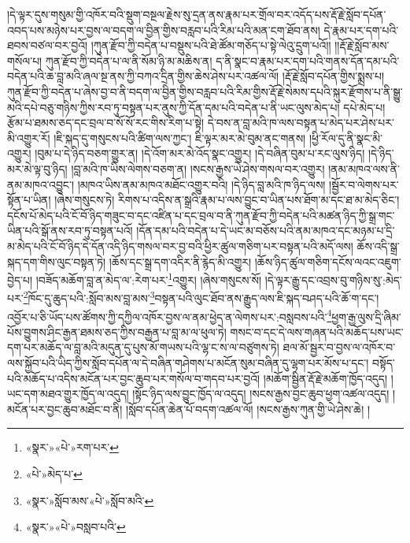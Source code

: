 །དེ་ལྟར་དུས་གསུམ་གྱི་འཁོར་བའི་སྡུག་བསྔལ་རྗེས་སུ་དྲན་ནས་རྣམ་པར་གྲོལ་བར་འདོད་པས་རྡོ་རྗེ་སློབ་དཔོན་འབད་པས་མཉེས་པར་བྱས་ལ་བདག་ལ་བྱིན་གྱིས་བརླབ་པའི་རིམ་པའི་མན་ངག་ཐོབ་ནས། དེ་རྣམ་པར་དག་པའི་ཐབས་བཙལ་བར་བྱའོ། །ཀུན་རྫོབ་ཀྱི་བདེན་པ་བསྡུས་པའི་ཐེ་ཚོམ་གཅོད་པ་སྟེ་ལེའུ་དྲུག་པའོ།། །།རྡོ་རྗེ་སློབ་མས་གསོལ་པ། ཀུན་རྫོབ་ཀྱི་བདེན་པ་ལ་ནི་སོམ་ཉི་མ་མཆིས་ན། ད་ནི་སྣང་བ་རྣམ་པར་དག་པའི་གནས་དོན་དམ་པའི་བདེན་པའི་ཆ་བླ་མའི་ཞལ་སྔ་ནས་ཀྱི་བཀའ་དྲིན་གྱིས་ཆེས་ཤེས་པར་འཚལ་ལོ། །རྡོ་རྗེ་སློབ་དཔོན་གྱིས་སྨྲས་པ། ཀུན་རྫོབ་ཀྱི་བདེན་པ་ཞེས་བྱ་བ་ནི་བདག་ལ་བྱིན་གྱིས་བརླབ་པའི་རིམ་གྱིས་རྡོ་རྗེ་སེམས་དཔའི་སྐུར་རྫོགས་པ་ནི་སྒྱུ་མའི་དཔེ་བཅུ་གཉིས་ཀྱིས་རབ་ཏུ་བསྟན་པར་ནུས་ཀྱི་དོན་དམ་པའི་བདེན་པ་ནི་ཡང་ལུས་མེད་པ། དཔེ་མེད་པ། རྩོམ་པ་ཐམས་ཅད་དང་བྲལ་བ་སོ་སོ་རང་གིས་རིག་པ་སྟེ། དེ་བས་ན་བླ་མའི་ཁ་ལས་བསྟན་པ་མེད་པར་ཤེས་པར་མི་འགྱུར་རོ། །ཇི་སྐད་དུ་གསུངས་པའི་ཚིག་ལས་ཀྱང་། ཇི་ལྟར་མར་མེ་བུམ་ནང་གནས། །ཕྱི་རོལ་དུ་ནི་སྣང་མི་འགྱུར། །བུམ་པ་དེ་ཉིད་བཅག་གྱུར་ན། །དེ་འོག་མར་མེ་འོད་སྣང་འགྱུར། །དེ་བཞིན་བུམ་པ་རང་ལུས་ཉིད། །དེ་ཉིད་མར་མེ་ལྟ་བུ་ཉིད། །བླ་མའི་ཁ་ཡིས་ལེགས་བཅག་ན། །སངས་རྒྱས་ཡེ་ཤེས་གསལ་བར་འགྱུར། །ནམ་མཁའ་ལས་ནི་ནམ་མཁའ་འབྱུང་། །མཁའ་ཡིས་ནམ་མཁའ་མཐོང་འགྱུར་བའི། །དེ་ཉིད་བླ་མའི་ཁ་ཉིད་ལས། །སྦྱོར་བ་ལེགས་པར་སྟོན་པ་ཡིན། །ཞེས་གསུངས་ཏེ། རིགས་པ་འདིས་ན་སྒྲའི་རྣམ་པ་ལས་བྱུང་བ་ཡིན་པས་ཐོག་མ་དང་ཐ་མ་མེད་ཅིང་། དངོས་པོ་མེད་པའི་ངོ་བོ་ཉིད་གཟུང་བ་དང་འཛིན་པ་དང་བྲལ་བ་ནི་ཀུན་རྫོབ་ཀྱི་བདེན་པའི་མཚན་ཉིད་ཀྱི་སྒྲ་གང་ཡིན་པའི་སྒོ་ནས་རབ་ཏུ་བསྟན་པའོ། །དོན་དམ་པའི་བདེན་པ་དེ་ཡང་མ་བཅོས་པའི་ནམ་མཁའ་དང་མཉམ་པ་དྲི་མ་མེད་པའི་ངོ་བོ་ཉིད་དེ་དོན་འདི་ཉིད་གསལ་བར་བྱ་བའི་ཕྱིར་ཚུལ་གཅིག་པར་བསྟན་པའི་མདོ་ལས། ཆོས་འདི་སྒྲ་སྐད་དག་གིས་ལུང་བསྟན་ཏེ། །ཆོས་དང་སྒྲ་དག་འདིར་ནི་རྙེད་མི་འགྱུར། །ཆོས་ཉིད་ཚུལ་གཅིག་དངོས་ལའང་འཇུག་བྱེད་པ། །བཟོད་མཆོག་བླ་ན་མེད་ལ་:རེག་པར་\footnote{«སྣར་»«པེ་»རག་པར་}འགྱུར། །ཞེས་གསུངས་སོ། །དེ་ལྟར་རྒྱུ་དང་འབྲས་བུ་གཉིས་སུ་:མེད་པར་\footnote{«པེ་»མེད་པ་}ཁོང་དུ་ཆུད་པའི་:སློབ་མས་བླ་མས་\footnote{«སྣར་»སློབ་མས་«པེ་»སློབ་མའི་}བསྟན་པའི་ལུང་ཐོབ་ནས་རྒྱུད་ལས་ཇི་སྐད་བཤད་པའི་ཆོ་ག་དང་། འབྱོར་པ་ཅི་ཡོད་པས་ཚོགས་ཀྱི་དཀྱིལ་འཁོར་བྱས་ལ་ནམ་ཕྱེད་ན་ལེགས་པར་:བསླབས་པའི་\footnote{«སྣར་»«པེ་»བསླབ་པའི་}ཕྱག་རྒྱ་ལུས་དྲི་ཞིམ་པོས་བྱུགས་ཤིང་རྒྱན་ཐམས་ཅད་ཀྱིས་བརྒྱན་པ་བླ་མ་ལ་ཕུལ་ཏེ། གསང་བ་དང་དེ་ལས་གཞན་པའི་མཆོད་པས་ཡང་དག་པར་མཆོད་ལ་བླ་མའི་མདུན་དུ་པུས་མོ་གཡས་པའི་ལྷ་ང་ས་ལ་བཙུགས་ཏེ། ཐལ་མོ་སྦྱར་བ་བྱས་ལ་འཁོར་བ་ལས་སྐྱོབ་པའི་ཡིད་ཀྱིས་སློབ་དཔོན་ལ་དེ་བཞིན་གཤེགས་པ་མངོན་སུམ་བཞིན་དུ་ལྷག་པར་མོས་པ་དང་། བསྟོད་པའི་མཆོད་པ་འདིས་མངོན་པར་བྱང་ཆུབ་པར་གསོལ་བ་གདབ་པར་བྱའོ། །མཆོག་སྦྱིན་རྡོ་རྗེ་མཆོག་ཁྱོད་འདུད། །ཡང་དག་མཐའ་གྱུར་ཁྱོད་ལ་འདུད། །སྟོང་ཉིད་ལས་བྱུང་ཁྱོད་ལ་འདུད། །སངས་རྒྱས་བྱང་ཆུབ་ཕྱག་འཚལ་འདུད། །མངོན་པར་བྱང་ཆུབ་མཐོང་བ་ནི། །སློབ་དཔོན་ཆེན་པོ་བདག་འཚལ་ལོ། །སངས་རྒྱས་ཀུན་གྱི་ཡེ་ཤེས་ཆེ། །
